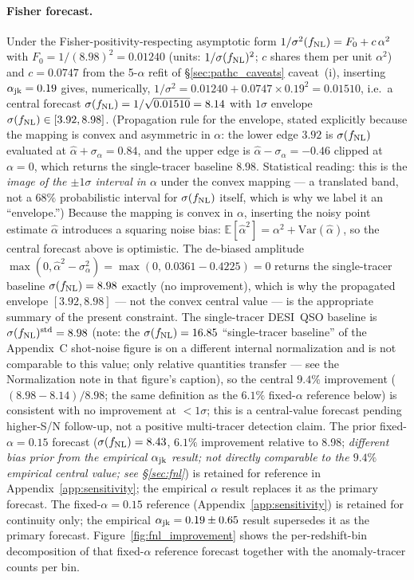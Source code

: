 \documentclass[aps,prd,twocolumn,superscriptaddress,showpacs,preprintnumbers,nofootinbib,longbibliography,floatfix]{revtex4-2}
\newcommand{\sigfnl}{\sigma(f_{\rm NL})}
\begin{document}
\paragraph{Fisher forecast.}
Under the Fisher-positivity-respecting asymptotic form $1/\sigma^2(f_{\rm NL}) = F_0 + c\,\alpha^2$ with $F_0 = 1/(8.98)^2 = 0.01240$ (units: $1/\sigfnl^2$; $c$ shares them per unit $\alpha^2$) and $c = 0.0747$ from the 5-$\alpha$ refit of \S\ref{sec:pathc_caveats} caveat~(i), inserting $\alpha_{\rm jk} = 0.19$ gives, numerically, $1/\sigma^2 = 0.01240 + 0.0747 \times 0.19^2 = 0.01510$, i.e.\ a central forecast $\sigfnl = 1/\sqrt{0.01510} = 8.14$ with $1\sigma$ envelope $\sigfnl \in [3.92, 8.98]$. (Propagation rule for the envelope, stated explicitly because the mapping is convex and asymmetric in $\alpha$: the lower edge $3.92$ is $\sigfnl$ evaluated at $\hat\alpha + \sigma_\alpha = 0.84$, and the upper edge is $\hat\alpha - \sigma_\alpha = -0.46$ clipped at $\alpha = 0$, which returns the single-tracer baseline $8.98$. Statistical reading: this is the \emph{image of the $\pm1\sigma$ interval in $\alpha$} under the convex mapping --- a translated band, not a $68\%$ probabilistic interval for $\sigfnl$ itself, which is why we label it an ``envelope.'') Because the mapping is convex in $\alpha$, inserting the noisy point estimate $\hat\alpha$ introduces a squaring noise bias: $\mathbb{E}[\hat\alpha^2] = \alpha^2 + \mathrm{Var}(\hat\alpha)$, so the central forecast above is optimistic. The de-biased amplitude $\max(0,\hat\alpha^2 - \sigma_\alpha^2) = \max(0,\, 0.0361 - 0.4225) = 0$ returns the single-tracer baseline $\sigfnl = 8.98$ exactly (no improvement), which is why the propagated envelope $[3.92, 8.98]$ --- not the convex central value --- is the appropriate summary of the present constraint. The single-tracer DESI~QSO baseline is $\sigfnl^{\rm std} = 8.98$ (note: the $\sigfnl = 16.85$ ``single-tracer baseline'' of the Appendix~C shot-noise figure is on a different internal normalization and is not comparable to this value; only relative quantities transfer --- see the Normalization note in that figure's caption), so the central $9.4\%$ improvement ($(8.98-8.14)/8.98$; the same definition as the $6.1\%$ fixed-$\alpha$ reference below) is consistent with no improvement at $<\!1\sigma$; this is a central-value forecast pending higher-S/N follow-up, not a positive multi-tracer detection claim. The prior fixed-$\alpha = 0.15$ forecast ($\sigfnl = 8.43$, $6.1\%$ improvement relative to 8.98; \emph{different bias prior from the empirical $\alpha_{\rm jk}$ result; not directly comparable to the $9.4\%$ empirical central value; see \S\ref{sec:fnl}}) is retained for reference in Appendix~\ref{app:sensitivity}; the empirical $\alpha$ result replaces it as the primary forecast. The fixed-$\alpha=0.15$ reference (Appendix~\ref{app:sensitivity}) is retained for continuity only; the empirical $\alpha_{\rm jk} = 0.19\pm0.65$ result supersedes it as the primary forecast. Figure~\ref{fig:fnl_improvement} shows the per-redshift-bin decomposition of that fixed-$\alpha$ reference forecast together with the anomaly-tracer counts per bin.
\end{document}
